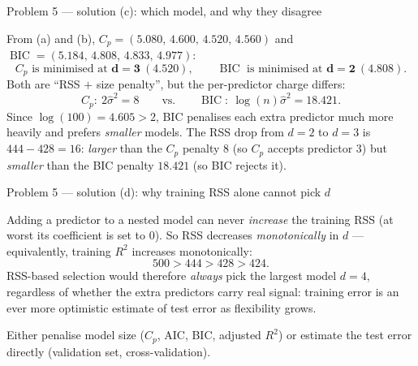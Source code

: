 \documentclass[aspectratio=169,11pt]{beamer}
\begin{document}
\begin{frame}{Problem 5 --- solution (c): which model, and why they disagree}
  \begin{solutionbox}
    From (a) and (b), $C_p=(5.080,\,4.600,\,4.520,\,4.560)$ and
    $\operatorname{BIC}=(5.184,\,4.808,\,4.833,\,4.977)$:
    \[
      C_p \text{ is minimised at } \mathbf{d=3}\ (4.520),
      \qquad
      \operatorname{BIC}\text{ is minimised at } \mathbf{d=2}\ (4.808).
    \]
    Both are ``RSS $+$ size penalty'', but the per-predictor charge differs:
    \[
      C_p:\ 2\hat{\sigma}^2=8
      \qquad\text{vs.}\qquad
      \operatorname{BIC}:\ \log(n)\hat{\sigma}^2=18.421 .
    \]
    Since $\log(100)=4.605>2$, BIC penalises each extra predictor much more heavily and
    prefers \emph{smaller} models. The RSS drop from $d=2$ to $d=3$ is $444-428=16$:
    \emph{larger} than the $C_p$ penalty $8$ (so $C_p$ accepts predictor $3$) but
    \emph{smaller} than the BIC penalty $18.421$ (so BIC rejects it).
  \end{solutionbox}
\end{frame}

\begin{frame}{Problem 5 --- solution (d): why training RSS alone cannot pick $d$}
  \begin{solutionbox}
    Adding a predictor to a nested model can never \emph{increase} the training RSS (at
    worst its coefficient is set to $0$). So RSS decreases \emph{monotonically} in $d$ ---
    equivalently, training $R^2$ increases monotonically:
    \[
      500 > 444 > 428 > 424 .
    \]
    RSS-based selection would therefore \emph{always} pick the largest model $d=4$,
    regardless of whether the extra predictors carry real signal: training error is an ever
    more optimistic estimate of test error as flexibility grows.
  \end{solutionbox}
  \begin{takeaway}
    Either penalise model size ($C_p$, AIC, BIC, adjusted $R^2$) or estimate the test error
    directly (validation set, cross-validation).
  \end{takeaway}
\end{frame}
\end{document}
